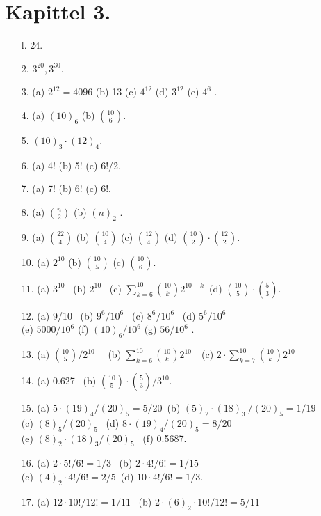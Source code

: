 \section*{Kapittel 3.}
\begin{itemize}         
\item[l.]  24.
\item[2.]  $3^{20}  , 3^{30}  .$
\item[3.]  (a)  $2^{12}=4096$  (b) 13 (c) $4^{12}$ (d) $ 3^{12}$ (e) $4^6$ .
\item[4.]  (a)  $(10)_6$    (b) $10\choose 6$.
\item[5.]  $(10)_3 \cdot (12)_4 $.
\item[6.]  (a)  4!   (b)  5!   (c)  6!/2.
\item[7.]  (a)  7!   (b)  6!   (c)  6!.
\item[8.]  (a) $n\choose 2$  (b) $(n)_2$ .
\item[9.]  (a) $22\choose 4$   (b) $10\choose 4$ (c) $12\choose 4 $
           (d) ${10\choose 2} \cdot {12\choose 2}$.
\item[10.]  (a)  $2^{10}$  (b)  $10\choose 5$   (c) $10\choose 6$.
\item[11.]  (a)  $3^{10}$   \  (b)  $2^{10}$    \
            (c) $\sum_{k=6}^{10} {10\choose k}2^{10-k}$\
            (d)  ${10\choose 5} \cdot {5\choose 3}.$
\item[12.]  (a)  9/10 \  (b) $ 9^6/10^6$ \  (c)  $8^6/10^6$ \ (d) $ 5^6/10^6$\\ 
            (e)  $5000/10^6 $   (f)  $(10)_6/10^6 $ (g) $ 56/10^6$ .
\item[13.]  (a)  ${10\choose 5}/2^{10}$  \ \
            (b)  $\sum_{k=6}^{10}{10\choose k}2^{10}$\ \
            (c)   $2\cdot \sum_{k=7}^{10}{10\choose k}2^{10}$
\item[14.]  (a)  0.627   \ (b) ${10\choose 5} \cdot {5\choose 3}/3^{10}.$
\item[15.]  (a)  $5\cdot (19)_4/(20)_5 = 5/20$\   (b)  $(5)_2 \cdot(18)_3\
             /(20)_5  = 1/19$\\
            (c)  $(8)_5/(20)_5$  \ (d)  $8\cdot(19)_4/(20)_5  = 8/20$\\
            (e)  $(8)_2\cdot(18)_3/(20)_5$  \  (f)  0.5687.
\item[16.]  (a)  $2\cdot 5!/6! = 1/3 $  \ (b)  $2\cdot 4!/6! = 1/15$\\
            (c)  $(4)_2\cdot 4!/6! = 2/5$\    (d)  $10\cdot 4!/6! = 1/3$.
\item[17.]  (a)  $12\cdot 10!/12! = 1/11$   \
            (b)  $2\cdot (6)_2 \cdot 10!/12! = 5/11$\\

\end{itemize}
